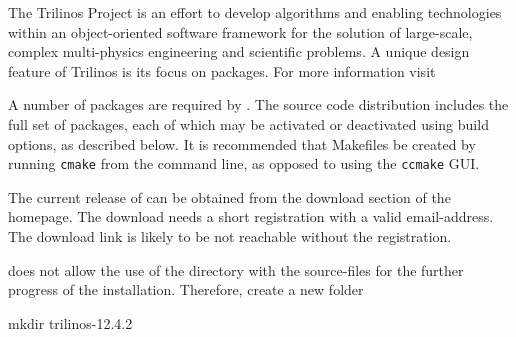 % 
%               
%          
% 

\levelstay{\texorpdfstring{\protect\marktool{\trilinosname{}}}{\trilinosname{}}}

The Trilinos Project is an effort to develop algorithms and enabling technologies within an object-oriented software framework for the solution of large-scale, complex multi-physics engineering and scientific problems. A unique design feature of Trilinos is its focus on packages. For more information visit

\href{\trilinosaddress}{\trilinosaddress}

A number of \marktool{\trilinosname} packages are required by \marktool{\toolname}. The \marktool{\trilinosname} source code distribution includes the full set of \marktool{\trilinosname} packages, each of which may be activated or deactivated using \marktool{\cmakename} build options, as described below. It is recommended that Makefiles be created by running \verb+cmake+ from the command line, as opposed to using the \verb+ccmake+ GUI.

The current release of \marktool[\trilinosaddress]{\trilinosname} can be obtained from the download section of the \marktool[\trilinosaddress]{\trilinosname} homepage. The download needs a short registration with a valid email-address. The download link is likely to be not reachable without the registration.

\begingroup
\lstset{breaklines=true}
\endgroup

\marktool{\trilinosname} does not allow the use of the directory with the source-files for the further progress of the installation. Therefore, create a new folder

\begin{code}
mkdir trilinos-12.4.2
\end{code}

